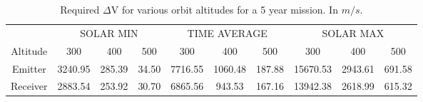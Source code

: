 \begin{table}
\centering
\begin{tabular}{ c | c | c | c | c | c | c | c | c | c }
& \multicolumn{3}{|c|}{SOLAR MIN}&\multicolumn{3}{|c|}{TIME AVERAGE}&\multicolumn{3}{|c}{SOLAR MAX} \\ \cline{2-10}
Altitude & 300 & 400 & 500 & 300 & 400 & 500 & 300 & 400 & 500 \\ \hline \hline
Emitter & 3240.95 & 285.39 & 34.50 & 7716.55 & 1060.48 & 187.88 & 15670.53 & 2943.61 & 691.58 \\
Receiver& 2883.54 & 253.92 & 30.70 & 6865.56 & 943.53 & 167.16 & 13942.38 & 2618.99 & 615.32 \\
\end{tabular}
\caption{Required $\Delta$V for various orbit altitudes for a 5 year mission. In $m/s$.}
\label{table:deltaVTable}
\end{table}
